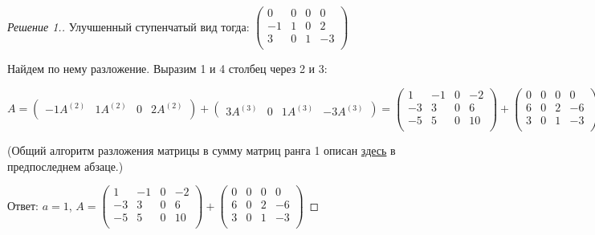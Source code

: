 \documentclass[a4paper]{article}
\theoremstyle{remark}
\begin{document}
\begin{proof}[Решение 1.]
            Улучшенный ступенчатый вид тогда: 
            $\begin{pmatrix}
                0 & 0 & 0 & 0 \\ 
                -1 & 1 & 0 & 2 \\ 
                3 & 0 & 1 & -3 \\ 
            \end{pmatrix}
            $

            Найдем по нему разложение. Выразим 1 и 4 столбец через 2 и 3: 

            $
            A = 
            \begin{pmatrix}
                -1A^{(2)} & 1A^{(2)} & 0 & 2A^{(2)} \\ 
            \end{pmatrix}
            + 
            \begin{pmatrix}
                3A^{(3)} & 0 & 1A^{(3)} & -3A^{(3)}
            \end{pmatrix} 
            = 
            \begin{pmatrix}
                1 & -1 & 0 & -2 \\ 
                -3 & 3 & 0 & 6 \\ 
                -5 & 5 & 0 & 10 \\ 
            \end{pmatrix}
            +
            \begin{pmatrix}
                0 & 0 & 0 & 0 \\ 
                6 & 0 & 2 & -6 \\ 
                3 & 0 & 1 & -3 \\ 
            \end{pmatrix}
            $

            (Общий алгоритм разложения матрицы в сумму матриц ранга 1 описан \href{https://drive.google.com/drive/folders/15svYwT_WAkuJ3TXS9_b5PeYdkD_t5gmj}{здесь} 
            в предпоследнем абзаце.) 

            Ответ: $a = 1$, $
            A = 
            \begin{pmatrix}
                1 & -1 & 0 & -2 \\ 
                -3 & 3 & 0 & 6 \\ 
                -5 & 5 & 0 & 10 \\ 
            \end{pmatrix}
            +
            \begin{pmatrix}
                0 & 0 & 0 & 0 \\ 
                6 & 0 & 2 & -6 \\ 
                3 & 0 & 1 & -3 \\ 
            \end{pmatrix}
            $
        \end{proof}
\end{document}
